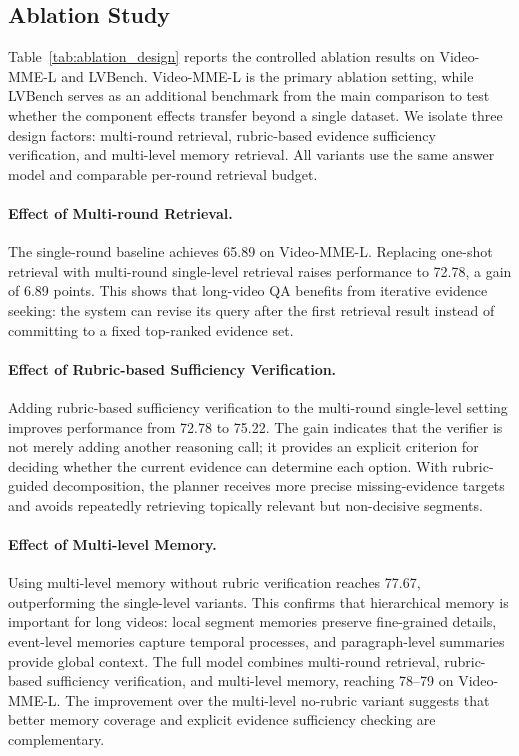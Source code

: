 \documentclass[letterpaper]{article} %
\begin{document}
\subsection{Ablation Study}

Table~\ref{tab:ablation_design} reports the controlled ablation results on Video-MME-L and LVBench. Video-MME-L is the primary ablation setting, while LVBench serves as an additional benchmark from the main comparison to test whether the component effects transfer beyond a single dataset. We isolate three design factors: multi-round retrieval, rubric-based evidence sufficiency verification, and multi-level memory retrieval. All variants use the same answer model and comparable per-round retrieval budget.

\paragraph{Effect of Multi-round Retrieval.}
The single-round baseline achieves 65.89 on Video-MME-L. Replacing one-shot retrieval with multi-round single-level retrieval raises performance to 72.78, a gain of 6.89 points. This shows that long-video QA benefits from iterative evidence seeking: the system can revise its query after the first retrieval result instead of committing to a fixed top-ranked evidence set.

\paragraph{Effect of Rubric-based Sufficiency Verification.}
Adding rubric-based sufficiency verification to the multi-round single-level setting improves performance from 72.78 to 75.22. The gain indicates that the verifier is not merely adding another reasoning call; it provides an explicit criterion for deciding whether the current evidence can determine each option. With rubric-guided decomposition, the planner receives more precise missing-evidence targets and avoids repeatedly retrieving topically relevant but non-decisive segments.

\paragraph{Effect of Multi-level Memory.}
Using multi-level memory without rubric verification reaches 77.67, outperforming the single-level variants. This confirms that hierarchical memory is important for long videos: local segment memories preserve fine-grained details, event-level memories capture temporal processes, and paragraph-level summaries provide global context. The full model combines multi-round retrieval, rubric-based sufficiency verification, and multi-level memory, reaching 78--79 on Video-MME-L. The improvement over the multi-level no-rubric variant suggests that better memory coverage and explicit evidence sufficiency checking are complementary.
\end{document}
